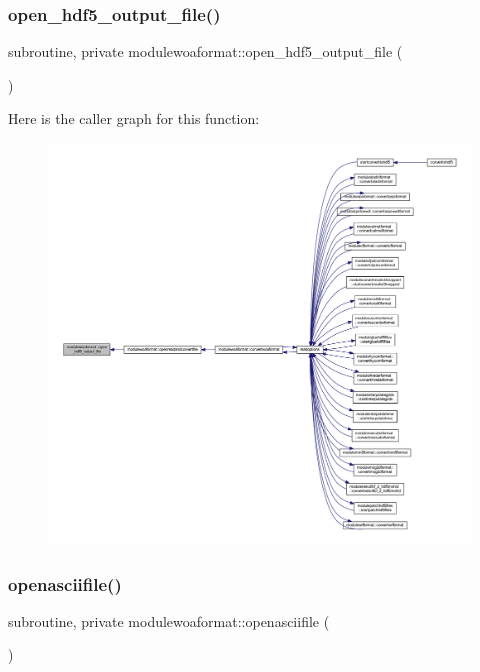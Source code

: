 \subsubsection{\texorpdfstring{open\+\_\+hdf5\+\_\+output\+\_\+file()}{open\_hdf5\_output\_file()}}
{\footnotesize\ttfamily subroutine, private modulewoaformat\+::open\+\_\+hdf5\+\_\+output\+\_\+file (\begin{DoxyParamCaption}{ }\end{DoxyParamCaption})\hspace{0.3cm}{\ttfamily [private]}}

Here is the caller graph for this function\+:\nopagebreak
\begin{figure}[H]
\begin{center}
\leavevmode
\includegraphics[width=350pt]{namespacemodulewoaformat_a3e2b959a1593bc7b6e5a52af13544bd1_icgraph}
\end{center}
\end{figure}
\mbox{\label{namespacemodulewoaformat_a0619fabdf9d39428f66319ee125ed3ce}} 
\subsubsection{\texorpdfstring{openasciifile()}{openasciifile()}}
{\footnotesize\ttfamily subroutine, private modulewoaformat\+::openasciifile (\begin{DoxyParamCaption}{ }\end{DoxyParamCaption})\hspace{0.3cm}{\ttfamily [private]}}

